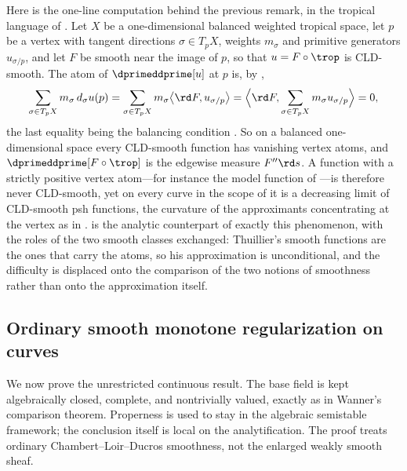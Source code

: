\begin{remark}
\label{rem:ch19-thuillier-balanced}
Here is the one-line computation behind the previous remark, in the tropical
language of .  Let
$X$ be a one-dimensional balanced weighted tropical space, let $p$ be a
vertex with tangent directions $\sigma\in T_pX$, weights $m_\sigma$ and
primitive generators $u_{\sigma/p}$, and let $F$ be smooth near the image
of $p$, so that $u=F\circ\trop$ is CLD-smooth.  The atom of
$\dprimeddprime[u]$ at $p$ is, by ,
\[
 \sum_{\sigma\in T_pX}m_\sigma\,d_\sigma u(p)
 =\sum_{\sigma\in T_pX}m_\sigma\bigl\langle\rd F,u_{\sigma/p}\bigr\rangle
 =\Bigl\langle\rd F,\sum_{\sigma\in T_pX}m_\sigma u_{\sigma/p}\Bigr\rangle
 =0 ,
\]
the last equality being the balancing condition
.  So on a balanced one-dimensional space
every CLD-smooth function has vanishing vertex atoms, and
$\dprimeddprime[F\circ\trop]$ is the edgewise measure $F''\rd s$.  A
function with a strictly positive vertex atom---for instance the model
function of ---is therefore never CLD-smooth, yet
on every curve in the scope of
 it is a decreasing limit
of CLD-smooth psh functions, the curvature of the approximants concentrating
at the vertex as in .
is the analytic counterpart of exactly this phenomenon, with the roles of the
two smooth classes exchanged: Thuillier's smooth functions are the ones that
carry the atoms, so his approximation is unconditional, and the difficulty is
displaced onto the comparison of the two notions of smoothness rather than
onto the approximation itself.
\end{remark}

\subsection{Ordinary smooth monotone regularization on curves}
\label{sec:ch19-ordinary-smooth-curve-regularization}

We now prove the unrestricted continuous result.  The base field is kept
algebraically closed, complete, and nontrivially valued, exactly as in
Wanner's comparison theorem.  Properness is used to stay in the algebraic
semistable framework; the conclusion itself is local on the analytification.
The proof treats ordinary Chambert--Loir--Ducros smoothness, not the enlarged
weakly smooth sheaf.

